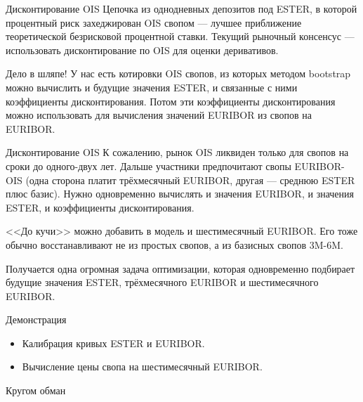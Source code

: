 \documentclass{beamer}
\begin{document}
\begin{frame}{Дисконтирование OIS}
\justify
Цепочка из однодневных депозитов под ESTER, в которой процентный риск захеджирован OIS свопом --- лучшее приближение теоретической безрисковой процентной ставки. Текущий рыночный консенсус --- использовать дисконтирование по OIS для оценки деривативов.

\justify
Дело в шляпе! У нас есть котировки OIS свопов, из которых методом bootstrap можно вычислить и будущие значения ESTER, и связанные с ними коэффициенты дисконтирования. Потом эти коэффициенты дисконтирования можно использовать для вычисления значений EURIBOR из свопов на EURIBOR.
\end{frame}



\begin{frame}{Дисконтирование OIS}
\justify
К сожалению, рынок OIS ликвиден только для свопов на сроки до одного-двух лет. Дальше участники предпочитают свопы EURIBOR-OIS (одна сторона платит трёхмесячный EURIBOR, другая --- среднюю ESTER плюс базис). Нужно одновременно вычислять и значения EURIBOR, и значения ESTER, и коэффициенты дисконтирования.

\justify
<<До кучи>> можно добавить в модель и шестимесячный EURIBOR. Его тоже обычно восстанавливают не из простых свопов, а из базисных свопов 3M-6M.

\justify
Получается одна огромная задача оптимизации, которая одновременно подбирает будущие значения ESTER, трёхмесячного EURIBOR и шестимесячного EURIBOR.
\end{frame}



\begin{frame}{Демонстрация}
\begin{itemize}
\item Калибрация кривых ESTER и EURIBOR.
\item Вычисление цены свопа на шестимесячный EURIBOR.
\end{itemize}
\end{frame}



\begin{frame}{Кругом обман}
\centering
{}
\end{frame}
\end{document}
